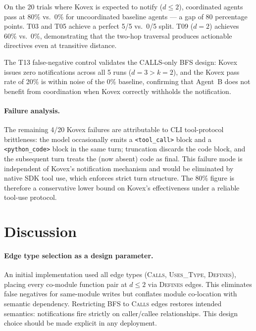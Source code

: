 \documentclass[12pt]{article}
\begin{document}
On the 20 trials where Kovex is expected to notify ($d \leq 2$),
coordinated agents pass at 80\% vs.\ 0\% for uncoordinated baseline agents
--- a gap of 80 percentage points. T03 and T05 achieve a perfect 5/5 vs.\ 0/5
split. T09 ($d=2$) achieves 60\% vs.\ 0\%, demonstrating that the two-hop
traversal produces actionable directives even at transitive distance.

The T13 false-negative control validates the CALLS-only BFS design: Kovex
issues zero notifications across all 5 runs ($d=3 > k=2$), and the Kovex
pass rate of 20\% is within noise of the 0\% baseline, confirming that
Agent~B does not benefit from coordination when Kovex correctly withholds
the notification.

\paragraph{Failure analysis.}
The remaining 4/20 Kovex failures are attributable to CLI tool-protocol
brittleness: the model occasionally emits a \texttt{<tool\_call>} block and
a \texttt{<python\_code>} block in the same turn; truncation discards the
code block, and the subsequent turn treats the (now absent) code as final.
This failure mode is independent of Kovex's notification mechanism and would
be eliminated by native SDK tool use, which enforces strict turn structure.
The 80\% figure is therefore a conservative lower bound on Kovex's
effectiveness under a reliable tool-use protocol.

\section{Discussion}

\paragraph{Edge type selection as a design parameter.}
An initial implementation used all edge types (\textsc{Calls},
\textsc{Uses\_Type}, \textsc{Defines}), placing every co-module function pair
at $d \leq 2$ via \textsc{Defines} edges. This eliminates false negatives for
same-module writes but conflates module co-location with semantic dependency.
Restricting BFS to \textsc{Calls} edges restores intended semantics:
notifications fire strictly on caller/callee relationships. This design choice
should be made explicit in any deployment.
\end{document}
